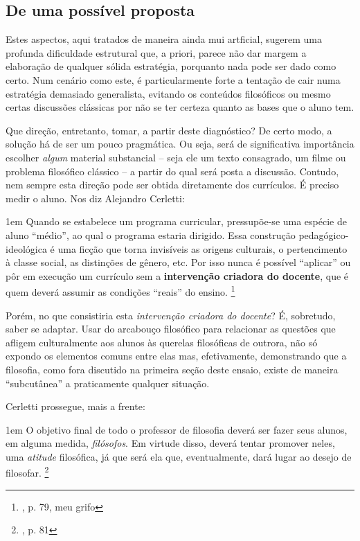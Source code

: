 \documentclass[12pt,a4paper]{article}
\newenvironment{citac}{
	\begin{addmargin}[4cm]{1em} \footnotesize}{\normalfont \end{addmargin}
}
\begin{document}
	\subsection{De uma possível proposta}
	
	Estes aspectos, aqui tratados de maneira ainda mui artficial, 
	sugerem uma profunda dificuldade estrutural que, a priori, parece 
	não dar margem a elaboração de qualquer sólida estratégia, porquanto 
	nada pode ser dado como certo. Num cenário como este, é 
	particularmente forte a tentação de cair numa estratégia demasiado 
	generalista, evitando os conteúdos filosóficos ou mesmo certas 
	discussões clássicas por não se ter certeza quanto as bases que 
	o aluno tem. 

	Que direção, entretanto, tomar, a partir deste diagnóstico? De certo 
	modo, a solução há de ser um pouco pragmática. Ou seja, será de 
	significativa importância escolher \emph{algum} material substancial
	-- seja ele um texto consagrado, um filme ou problema filosófico 
	clássico -- a partir do qual será posta a discussão. Contudo, nem 
	sempre esta direção pode ser obtida diretamente dos currículos. É 
	preciso medir o aluno. Nos diz Alejandro Cerletti: 

	\begin{citac}
		Quando se estabelece um programa curricular, pressupõe-se 
		uma espécie de aluno “médio”, ao qual o programa estaria 
		dirigido. Essa construção pedagógico-ideológica é uma 
		ficção que torna invisíveis as origens culturais, o 
		pertencimento à classe social, as distinções de gênero, 
		etc. Por isso nunca é possível “aplicar” ou pôr em 
		execução um currículo sem a \textbf{intervenção 
		criadora do docente}, que é quem deverá assumir as 
		condições “reais” do ensino. 
		\footnote{\cite{cerletti}, p. 79, meu grifo}
	\end{citac}

	Porém, no que consistiria esta \emph{intervenção criadora do docente}? 
	É, sobretudo, saber se adaptar. Usar do arcabouço filosófico para 
	relacionar as questões que afligem culturalmente aos alunos às 
	querelas filosóficas de outrora, não só expondo os elementos comuns 
	entre elas mas, efetivamente, demonstrando que a filosofia, como 
	fora discutido na primeira seção deste ensaio, existe de maneira 
	“subcutânea” a praticamente qualquer situação. 

	Cerletti prossegue, mais a frente: 

	\begin{citac}
		O objetivo final de todo o professor de filosofia deverá ser
		fazer seus alunos, em alguma medida, \textit{filósofos}. Em 
		virtude disso, deverá tentar promover neles, uma \textit{
		atitude} filosófica, já que será ela que, eventualmente, dará 
		lugar ao desejo de filosofar. 
		\footnote{\cite{cerletti}, p. 81}
	\end{citac}
\end{document}
